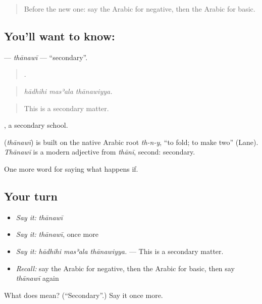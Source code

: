\begin{quote}
Before the new one: say the Arabic for negative, then the Arabic for basic.
\end{quote}

\subsection*{You'll want to know: }
\textbf{} — \emph{thānawī} — \textquotedblleft{}secondary\textquotedblright{}.

\begin{quote}
  .
\end{quote}

\begin{quote}
\emph{hādhihi masʾala thānawiyya.}
\end{quote}

\begin{quote}
This is a secondary matter.
\end{quote}

 , a secondary school.

\begin{cousinweb}
\textbf{} (\emph{thānawī}) is built on the native Arabic root \emph{th-n-y}, \textquotedblleft{}to fold; to make two\textquotedblright{} (Lane). \emph{Thānawī} is a modern adjective from \emph{thānī}, second: secondary.
\end{cousinweb}

\begin{grammarlens}[title={What you've built}]
One more word for saying what happens if.
\end{grammarlens}

\subsection*{Your turn}
\begin{itemize}
\raggedright
  \item \emph{Say it:} \emph{thānawī}
  \item \emph{Say it:} \emph{thānawī}, once more
  \item \emph{Say it:} \emph{hādhihi masʾala thānawiyya.} — This is a secondary matter.
  \item \emph{Recall:} say the Arabic for negative, then the Arabic for basic, then say \emph{thānawī} again
\end{itemize}

\begin{tcolorbox}[breakable,colback=teal!4,colframe=teal!35!black,title={Before you move on}]
What does  mean? (\textquotedblleft{}Secondary\textquotedblright{}.) Say it once more.
\end{tcolorbox}
